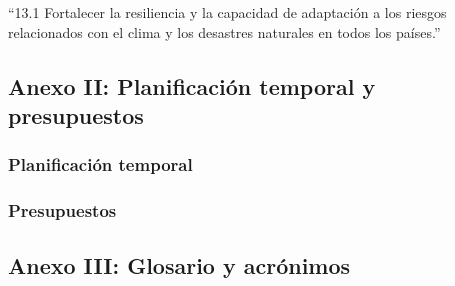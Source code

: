 \documentclass[a4paper, 12pt, spanish, twoside]{article}
\begin{document}
“13.1 Fortalecer la resiliencia y la capacidad de adaptación a los riesgos relacionados con el clima y los desastres naturales en todos los países.”

\clearpage




\newpage
\subsection{Anexo II: Planificación temporal y presupuestos} \label{sec:anexo2}
\subsubsection{Planificación temporal} \label{sec:anexo2:temporal}
\subsubsection{Presupuestos} \label{sec:anexo2:presupuestos}

\clearpage




\newpage
\subsection{Anexo III: Glosario y acrónimos} \label{sec:anexo3}

\glsaddall


\printglossary[title=Glosario, toctitle=Glosario]

\newpage
\printglossary[type=\acronymtype, title={Abreviaturas, unidades y acrónimos}, toctitle={Abreviaturas, unidades y acrónimos}]
\end{document}
